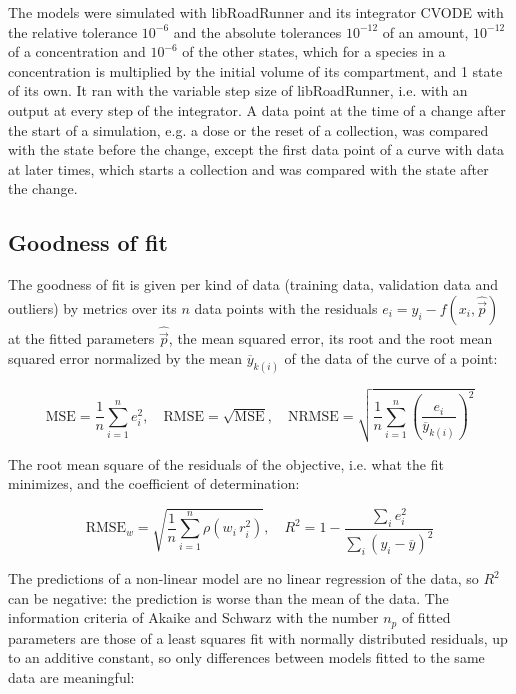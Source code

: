 \documentclass{article}
\begin{document}
The models were simulated with libRoadRunner \cite{Welsh2023} and its integrator CVODE \cite{Hindmarsh2005} with the relative tolerance $10^{-6}$ and the absolute tolerances $10^{-12}$ of an amount, $10^{-12}$ of a concentration and $10^{-6}$ of the other states, which for a species in a concentration is multiplied by the initial volume of its compartment, and 1 state of its own. It ran with the variable step size of libRoadRunner, i.e. with an output at every step of the integrator. A data point at the time of a change after the start of a simulation, e.g. a dose or the reset of a collection, was compared with the state before the change, except the first data point of a curve with data at later times, which starts a collection and was compared with the state after the change.

\subsection{Goodness of fit}

The goodness of fit is given per kind of data (training data, validation data and outliers) by metrics over its $n$ data points with the residuals $e_i = y_i - f(x_i, \hat{\vec{p}})$ at the fitted parameters $\hat{\vec{p}}$, the mean squared error, its root and the root mean squared error normalized by the mean $\overline{y}_{k(i)}$ of the data of the curve of a point:

\begin{equation}
\mathrm{MSE} = \frac{1}{n} \sum_{i=1}^{n} e_i^2, \quad \mathrm{RMSE} = \sqrt{\mathrm{MSE}}, \quad \mathrm{NRMSE} = \sqrt{\frac{1}{n} \sum_{i=1}^{n} \left(\frac{e_i}{\overline{y}_{k(i)}}\right)^2}
\end{equation}

The root mean square of the residuals of the objective, i.e. what the fit minimizes, and the coefficient of determination:

\begin{equation}
\mathrm{RMSE}_w = \sqrt{\frac{1}{n} \sum_{i=1}^{n} \rho\left(w_i\, r_i^2\right)}, \quad R^2 = 1 - \frac{\sum_{i} e_i^2}{\sum_{i} \left(y_i - \overline{y}\right)^2}
\end{equation}

The predictions of a non-linear model are no linear regression of the data, so $R^2$ can be negative: the prediction is worse than the mean of the data. The information criteria of Akaike \cite{Akaike1974} and Schwarz \cite{Schwarz1978} with the number $n_p$ of fitted parameters are those of a least squares fit with normally distributed residuals, up to an additive constant, so only differences between models fitted to the same data are meaningful:
\end{document}
